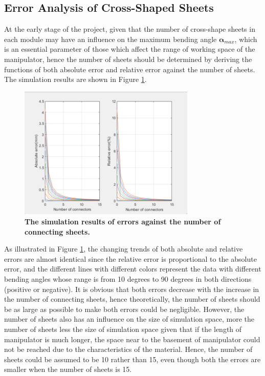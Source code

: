 \subsection{Error Analysis of Cross-Shaped Sheets}
At the early stage of the project, given that the number of cross-shape sheets in each module may have an 
influence on the maximum bending angle $\boldsymbol{\alpha}_{max}$, which is an essential parameter of those which 
affect the range of working space of the manipulator, hence the number of sheets should be determined by deriving 
the functions of both absolute error and relative error \cite{fishboneCR} against the number of sheets. The 
simulation results are shown in Figure \ref{fig:error_analysis}.
\begin{figure}[H] %
    \centering 
    \captionsetup{labelsep=colon}
    \includegraphics[width=0.75\textwidth]{Image/Result/error_analysis.png} 
    \caption[The simulation results of errors against the number of connecting sheets]
    {\centering \textbf{The simulation results of errors against the number of connecting sheets.}}
    \label{fig:error_analysis}
\end{figure}
As illustrated in Figure \ref{fig:error_analysis}, the changing trends of both absolute and relative errors are 
almost identical since 
the relative error is proportional to the absolute error, and the different lines with different colors represent 
the data with different bending angles whose range is from 10 degrees to 90 degrees in both directions (positive 
or negative). It is obvious that both errors decrease with the increase in the number of connecting sheets, hence 
theoretically, the number of sheets should be as large as possible to make both errors could be negligible. However, 
the number of sheets also has an influence on the size of simulation space, more the number of sheets less the size 
of simulation space given that if the length of manipulator is much longer, the space near to the basement of 
manipulator could not be reached due to the characteristics of the material. Hence, the number of sheets could be 
assumed to be 10 rather than 15, even though both the errors are smaller when the number of sheets is 15. \\
